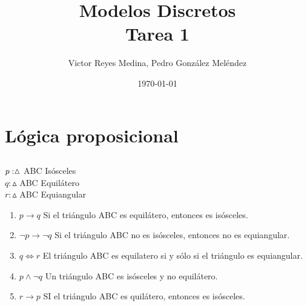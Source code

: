 \documentclass[11pt]{utalcaDoc}
\title{{\bf Modelos Discretos}\\Tarea 1}
\author{Victor Reyes Medina,  Pedro González Meléndez}
\date{\today}
\begin{document}
\renewcommand{\figurename}{Figura~}
\renewcommand{\tablename}{Tabla~}
\renewcommand{\theenumii}{\arabic{enumii}}
\renewcommand{\labelenumii}{%
 \theenumi.\theenumii.
}
\maketitle

\section{Lógica proposicional}

\subsection{ } %

$\\p:  \vartriangle$ ABC Isósceles \\
$q:  \vartriangle$ ABC Equilátero \\
$r:  \vartriangle$ ABC Equiangular\\

\begin{enumerate}
\item $p \to q$ Si el triángulo ABC es equilátero, entonces es isósceles.
\item $\neg p \to \neg q$ Si el triángulo ABC no es isósceles, entonces no es equiangular. 
\item $q \iff r$ El triángulo ABC es equilatero si y sólo si el triángulo es equiangular. 
\item $p \wedge \neg q$ Un triángulo ABC es isósceles y no equilátero.
\item $r \to p$ SI el triángulo ABC es quilátero, entonces es isósceles.
\end{enumerate}

\newpage 
\end{document}

